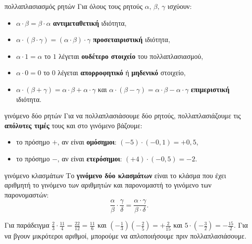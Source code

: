 

\begin{idiotita}{πολλαπλασιασμός ρητών}
Για όλους τους ρητούς $\alpha,\,\beta,\,\gamma$ ισχύουν:
\begin{itemize}[leftmargin=1.2em,itemsep=0.3ex,topsep=2pt]
\item $\alpha\cdot\beta=\beta\cdot\alpha$ \quad \textbf{αντιμεταθετική} ιδιότητα,
\item $\alpha\cdot(\beta\cdot\gamma)=(\alpha\cdot\beta)\cdot\gamma$ \quad \textbf{προσεταιριστική} ιδιότητα,
\item $\alpha\cdot1=\alpha$ \quad το $1$ λέγεται \textbf{ουδέτερο στοιχείο} του πολλαπλασιασμού,
\item $\alpha\cdot0=0$ \quad το $0$ λέγεται \textbf{απορροφητικό} ή \textbf{μηδενικό} στοιχείο,
\item $\alpha\cdot(\beta+\gamma)=\alpha\cdot\beta+\alpha\cdot\gamma$ και $\alpha\cdot(\beta-\gamma)=\alpha\cdot\beta-\alpha\cdot\gamma$ \quad \textbf{επιμεριστική} ιδιότητα.
\end{itemize}
\end{idiotita}


\begin{kanonas}{γινόμενο δύο ρητών}
Για να πολλαπλασιάσουμε δύο ρητούς, πολλαπλασιάζουμε τις \textbf{απόλυτες τιμές} τους και στο γινόμενο βάζουμε:
\begin{itemize}[leftmargin=1.2em,itemsep=0.3ex,topsep=2pt]
\item το πρόσημο $+$, αν είναι \textbf{ομόσημοι}: $(-5)\cdot(-0{,}1)=+0{,}5$,
\item το πρόσημο $-$, αν είναι \textbf{ετερόσημοι}: $(+4)\cdot(-0{,}5)=-2$.
\end{itemize}
\end{kanonas}

\begin{kanonas}{γινόμενο κλασμάτων}
Το \textbf{γινόμενο δύο κλασμάτων} είναι το κλάσμα που έχει αριθμητή το γινόμενο των αριθμητών και παρονομαστή το γινόμενο των παρονομαστών:
$$\dfrac{\alpha}{\beta}\cdot\dfrac{\gamma}{\delta}=\dfrac{\alpha\cdot\gamma}{\beta\cdot\delta}.$$
\end{kanonas}

Για παράδειγμα $\frac{2}{3}\cdot\frac{11}{4}=\frac{22}{12}=\frac{11}{6}$ και $\left(-\frac{1}{3}\right)\left(-\frac{2}{5}\right)=+\frac{2}{15}$ και $5\cdot\left(-\frac{3}{2}\right)=-\frac{15}{2}$. Για να βγουν μικρότεροι αριθμοί, μπορούμε να απλοποιήσουμε πριν πολλαπλασιάσουμε.

